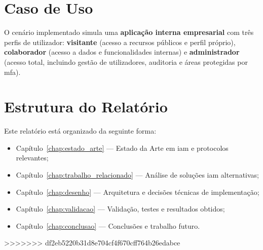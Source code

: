 \section{Caso de Uso}

O cenário implementado simula uma \textbf{aplicação interna empresarial} com três perfis de utilizador: \textbf{visitante} (acesso a recursos públicos e perfil próprio), \textbf{colaborador} (acesso a dados e funcionalidades internas) e \textbf{administrador} (acesso total, incluindo gestão de utilizadores, auditoria e áreas protegidas por \gls{mfa}).

\section{Estrutura do Relatório}

Este relatório está organizado da seguinte forma:
\begin{itemize}
  \item Capítulo~\ref{chap:estado_arte} — Estado da Arte em \gls{iam} e protocolos relevantes;
  \item Capítulo~\ref{chap:trabalho_relacionado} — Análise de soluções \gls{iam} alternativas;
  \item Capítulo~\ref{chap:desenho} — Arquitetura e decisões técnicas de implementação;
  \item Capítulo~\ref{chap:validacao} — Validação, testes e resultados obtidos;
  \item Capítulo~\ref{chap:conclusao} — Conclusões e trabalho futuro.
\end{itemize}
>>>>>>> df2eb5220b31d8e704cf4f670cff764b26edabce
